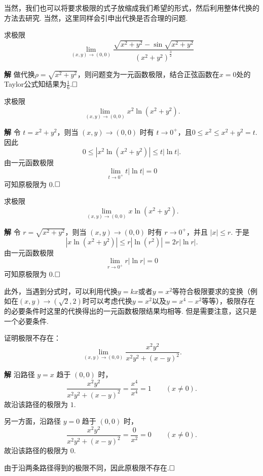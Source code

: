 \documentclass{ctexart}
\newenvironment{custom}[1]{\par\noindent \textbf{#1}\quad}{\par\vspace{1em}}
\begin{document}
当然，我们也可以将要求极限的式子放缩成我们希望的形式，然后利用整体代换的方法去研究. 当然，这里同样会引申出代换是否合理的问题.

\begin{example}
求极限
$$\lim\limits_{(x,y)\to(0,0)}{\frac{\sqrt{x^{2}+y^{2}}-\sin{\sqrt{x^{2}+y^{2}}}}{(x^{2}+y^{2})^{\frac{3}{2}}}}$$
\end{example}

\begin{custom}{解}
做代换$\rho=\sqrt{x^{2}+y^{2}}$，则问题变为一元函数极限，结合正弦函数在$x=0$处的Taylor公式知结果为$\frac{1}{6}$.$\hfill{\square}$
\end{custom}

\begin{exercise}
求极限
$$\lim\limits_{(x,y)\to(0,0)}{x^{2}\ln{(x^{2}+y^{2})}}.$$
\end{exercise}

\begin{custom}{解}
令 $t=x^2+y^2$，则当 $(x,y)\to(0,0)$ 时有 $t\to 0^+$，且$0\leqslant x^2\leqslant x^2+y^2=t.$
因此
$$0\leqslant |x^2\ln(x^2+y^2)|\leqslant t|\ln t|.$$
由一元函数极限
$$\lim\limits_{t\to 0^+}t|\ln t|=0$$
可知原极限为 $0$.$\hfill{\square}$
\end{custom}

\begin{exercise}
求极限
$$\lim\limits_{(x,y)\to(0,0)}{x\ln{(x^{2}+y^{2})}}.$$
\end{exercise}

\begin{custom}{解}
令 $r=\sqrt{x^2+y^2}$，则当 $(x,y)\to(0,0)$ 时有 $r\to 0^+$，并且 $|x|\leqslant r$.
于是
$$|x\ln(x^2+y^2)|
\leqslant r|\ln(r^2)|
=2r|\ln r|.$$
由一元函数极限
$$\lim\limits_{r\to 0^+}r|\ln r|=0$$
可知原极限为 $0$.$\hfill{\square}$
\end{custom}

此外，当遇到分式时，可以利用代换$y=kx$或者$y=x^{2}$等符合极限要求的变换（例如在$(x,y)\to(\sqrt{2},2)$时可以考虑代换$y=x^{2}$以及$y=x^{4}-x^{2}$等等），极限存在的必要条件时这里的代换得出的一元函数极限结果均相等. 但是需要注意，这只是一个必要条件.

\begin{exercise}
证明极限不存在：
$$\lim\limits_{(x,y)\to(0,0)}{\frac{x^{2}y^{2}}{x^{2}y^{2}+(x-y)^{2}}}.$$
\end{exercise}

\begin{custom}{解}
沿路径 $y=x$ 趋于 $(0,0)$ 时，
$$\frac{x^2y^2}{x^2y^2+(x-y)^2}
=\frac{x^4}{x^4}=1\qquad (x\neq 0).$$
故沿该路径的极限为 $1$.

另一方面，沿路径 $y=0$ 趋于 $(0,0)$ 时，
$$\frac{x^2y^2}{x^2y^2+(x-y)^2}
=\frac{0}{x^2}=0\qquad (x\neq 0).$$
故沿该路径的极限为 $0$.

由于沿两条路径得到的极限不同，因此原极限不存在.$\hfill{\square}$
\end{custom}
\end{document}
